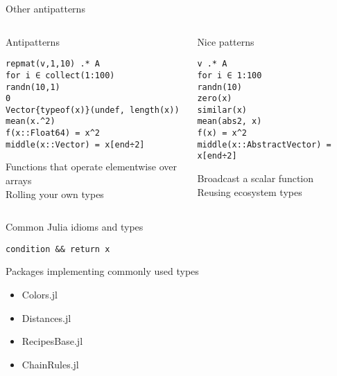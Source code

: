 \begin{frame}[fragile]{Other antipatterns}{}
    \begin{columns}
        \begin{column}{0.46\textwidth}
            \begin{block}{Antipatterns}
        \begin{verbatim}
repmat(v,1,10) .* A
for i ∈ collect(1:100)
randn(10,1)
0
Vector{typeof(x)}(undef, length(x))
mean(x.^2)
f(x::Float64) = x^2
middle(x::Vector) = x[end÷2]
        \end{verbatim}
        Functions that operate elementwise over arrays\\
        Rolling your own types
    \end{block}
    \end{column}

    \begin{column}{0.46\textwidth}
        \begin{block}{Nice patterns}
    \begin{verbatim}
v .* A
for i ∈ 1:100
randn(10)
zero(x)
similar(x)
mean(abs2, x)
f(x) = x^2
middle(x::AbstractVector) = x[end÷2]
    \end{verbatim}
    Broadcast a scalar function\\
    Reusing ecosystem types
\end{block}
\end{column}
\end{columns}

\end{frame}



\begin{frame}[fragile]{Common Julia idioms and types}{}
    \begin{verbatim}
condition && return x
    \end{verbatim}

Packages implementing commonly used types
\begin{itemize}
    \item Colors.jl
    \item Distances.jl
    \item RecipesBase.jl
    \item ChainRules.jl
\end{itemize}




\end{frame}
